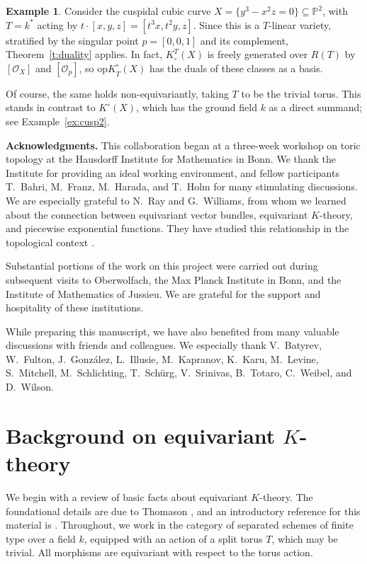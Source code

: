 \documentclass[11pt]{amsart}
\theoremstyle{definition}
\newtheorem{example}[theorem]{Example}
\begin{document}
\begin{example}\label{ex:cusp1}
Consider the cuspidal cubic curve $X = \{y^3-x^2 z = 0\} \subseteq {\mathbb{P}}^2$, with $T={k}^*$ acting by $t\cdot[x,y,z]=[t^3 x, t^2 y, z]$.  Since this is a $T$-linear variety, stratified by the singular point $p=[0,0,1]$ and its complement, Theorem~\ref{t:duality} applies.  In fact, $K^T_\circ(X)$ is freely generated over $R(T)$ by $[{\mathcal{O}}_X]$ and $[{\mathcal{O}}_p]$, so ${\mathrm{op}K}_T^\circ(X)$ has the duals of these classes as a basis.

Of course, the same holds non-equivariantly, taking $T$ to be the trivial torus.  This stands in contrast to $K^\circ(X)$, which has the ground field ${k}$ as a direct summand; see Example~\ref{ex:cusp2}.
\end{example}

\bigskip

\noindent \textbf{Acknowledgments.} This collaboration began at a three-week workshop on toric topology at the Hausdorff Institute for Mathematics in Bonn.  We thank the Institute for providing an ideal working environment, and fellow participants T.~Bahri, M.~Franz, M.~Harada, and T.~Holm for many
stimulating discussions.  We are especially grateful to N.~Ray and G.~Williams, from whom we learned about the connection between equivariant vector bundles, equivariant $K$-theory, and piecewise exponential functions.  They have studied this relationship in the topological context \cite{rw}.  

Substantial portions of the work on this project were carried out during subsequent visits to Oberwolfach, the Max Planck Institute in Bonn, and the Institute of Mathematics of Jussieu.  We are grateful for the support and hospitality of these institutions.  

While preparing this manuscript, we have also benefited from many valuable discussions with friends and colleagues.  We especially thank V.~Batyrev, W.~Fulton, J.~Gonz\'alez, L.~Illusie, M.~Kapranov, K.~Karu, M.~Levine, S.~Mitchell, M.~Schlichting, T.~Sch\"urg, V.~Srinivas, B.~Totaro, C.~Weibel, and D.~Wilson.

\section{Background on equivariant $K$-theory}\label{s:eqk}

We begin with a review of basic facts about equivariant $K$-theory.  The foundational details are due to Thomason \cite{thomason,thomason-inv}, and an introductory reference for this material is \cite[\S5]{cg}.  Throughout, we work in the category of separated schemes of finite type over a field ${k}$, equipped with an action of a split torus $T$, which may be trivial.  All morphisms are equivariant with respect to the torus action.  
\end{document}
